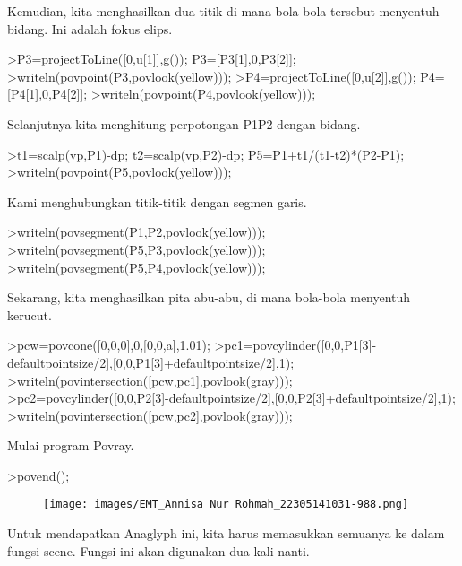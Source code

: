 \documentclass[a4paper,10pt]{article}
\begin{document}
\begin{eulernotebook}
\begin{eulercomment}
\begin{eulercomment}
\begin{eulercomment}
\begin{eulercomment}
\begin{eulercomment}
Kemudian, kita menghasilkan dua titik di mana bola-bola tersebut
menyentuh bidang. Ini adalah fokus elips.
\end{eulercomment}
\begin{eulerprompt}
>P3=projectToLine([0,u[1]],g()); P3=[P3[1],0,P3[2]];
>writeln(povpoint(P3,povlook(yellow)));
>P4=projectToLine([0,u[2]],g()); P4=[P4[1],0,P4[2]];
>writeln(povpoint(P4,povlook(yellow)));
\end{eulerprompt}
\begin{eulercomment}
Selanjutnya kita menghitung perpotongan P1P2 dengan bidang.
\end{eulercomment}
\begin{eulerprompt}
>t1=scalp(vp,P1)-dp; t2=scalp(vp,P2)-dp; P5=P1+t1/(t1-t2)*(P2-P1);
>writeln(povpoint(P5,povlook(yellow)));
\end{eulerprompt}
\begin{eulercomment}
Kami menghubungkan titik-titik dengan segmen garis.
\end{eulercomment}
\begin{eulerprompt}
>writeln(povsegment(P1,P2,povlook(yellow)));
>writeln(povsegment(P5,P3,povlook(yellow)));
>writeln(povsegment(P5,P4,povlook(yellow)));
\end{eulerprompt}
\begin{eulercomment}
Sekarang, kita menghasilkan pita abu-abu, di mana bola-bola menyentuh
kerucut.
\end{eulercomment}
\begin{eulerprompt}
>pcw=povcone([0,0,0],0,[0,0,a],1.01);
>pc1=povcylinder([0,0,P1[3]-defaultpointsize/2],[0,0,P1[3]+defaultpointsize/2],1);
>writeln(povintersection([pcw,pc1],povlook(gray)));
>pc2=povcylinder([0,0,P2[3]-defaultpointsize/2],[0,0,P2[3]+defaultpointsize/2],1);
>writeln(povintersection([pcw,pc2],povlook(gray)));
\end{eulerprompt}
\begin{eulercomment}
Mulai program Povray.
\end{eulercomment}
\begin{eulerprompt}
>povend();
\end{eulerprompt}
\begin{figure}[h]
    \centering
    \texttt{[image: images/EMT\_Annisa Nur Rohmah\_22305141031-988.png]}
\end{figure}
\begin{eulercomment}
Untuk mendapatkan Anaglyph ini, kita harus memasukkan semuanya ke
dalam fungsi scene. Fungsi ini akan digunakan dua kali nanti.

\end{eulercomment}
\end{eulercomment}
\end{eulercomment}
\end{eulercomment}
\end{eulercomment}
\end{eulernotebook}
\end{document}
